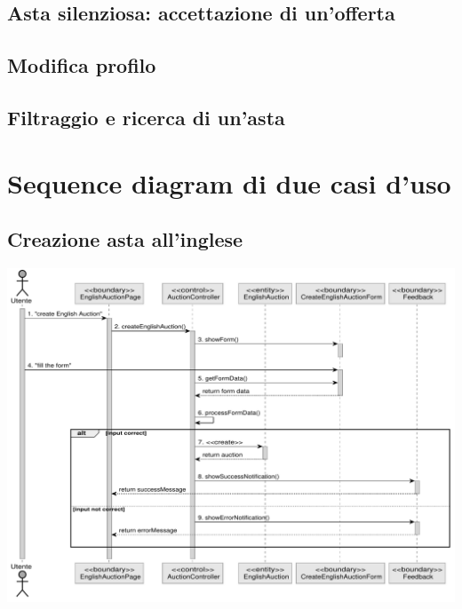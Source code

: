 {	\subsection*{Asta silenziosa: accettazione di un'offerta}
	
	\newpage

	\subsection*{Modifica profilo}
	
	\newpage

	\subsection*{Filtraggio e ricerca di un'asta}
	
} %

\newpage
\section{Sequence diagram di due casi d'uso}
\subsection{Creazione asta all'inglese}
\includegraphics[width=\textwidth]{assets/sequence/creazione_asta_inglese.pdf}
\newpage

